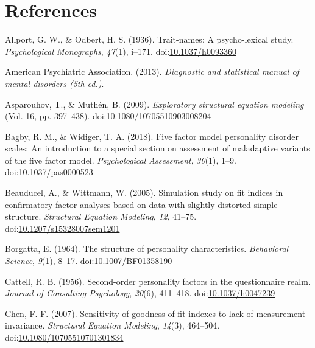 \documentclass[man]{apa6}
\theoremstyle{definition}
\theoremstyle{definition}
\theoremstyle{definition}
\theoremstyle{remark}
\begin{document}
\newpage

\hypertarget{references}{%
\section{References}\label{references}}

\begingroup
\setlength{\parindent}{-0.5in}
\setlength{\leftskip}{0.5in}

\hypertarget{refs}{}
\leavevmode\hypertarget{ref-AllportOdbert1936}{}%
Allport, G. W., \& Odbert, H. S. (1936). Trait-names: A psycho-lexical
study. \emph{Psychological Monographs}, \emph{47}(1), i--171.
doi:\href{https://doi.org/10.1037/h0093360}{10.1037/h0093360}

\leavevmode\hypertarget{ref-APA2013}{}%
American Psychiatric Association. (2013). \emph{Diagnostic and
statistical manual of mental disorders (5th ed.)}.

\leavevmode\hypertarget{ref-AsparouhovMuthen2009}{}%
Asparouhov, T., \& Muthén, B. (2009). \emph{Exploratory structural
equation modeling} (Vol. 16, pp. 397--438).
doi:\href{https://doi.org/10.1080/10705510903008204}{10.1080/10705510903008204}

\leavevmode\hypertarget{ref-Bagby2018}{}%
Bagby, R. M., \& Widiger, T. A. (2018). Five factor model personality
disorder scales: An introduction to a special section on assessment of
maladaptive variants of the five factor model. \emph{Psychological
Assessment}, \emph{30}(1), 1--9.
doi:\href{https://doi.org/10.1037/pas0000523}{10.1037/pas0000523}

\leavevmode\hypertarget{ref-Beauducel2005}{}%
Beauducel, A., \& Wittmann, W. (2005). Simulation study on fit indices
in confirmatory factor analyses based on data with slightly distorted
simple structure. \emph{Structural Equation Modeling}, \emph{12},
41--75.
doi:\href{https://doi.org/10.1207/s15328007sem1201}{10.1207/s15328007sem1201}

\leavevmode\hypertarget{ref-Borgatta1964}{}%
Borgatta, E. (1964). The structure of personality characteristics.
\emph{Behavioral Science}, \emph{9}(1), 8--17.
doi:\href{https://doi.org/10.1007/BF01358190}{10.1007/BF01358190}

\leavevmode\hypertarget{ref-Cattell1956}{}%
Cattell, R. B. (1956). Second-order personality factors in the
questionnaire realm. \emph{Journal of Consulting Psychology},
\emph{20}(6), 411--418.
doi:\href{https://doi.org/10.1037/h0047239}{10.1037/h0047239}

\leavevmode\hypertarget{ref-Chen2007}{}%
Chen, F. F. (2007). Sensitivity of goodness of fit indexes to lack of
measurement invariance. \emph{Structural Equation Modeling},
\emph{14}(3), 464--504.
doi:\href{https://doi.org/10.1080/10705510701301834}{10.1080/10705510701301834}
\end{document}

